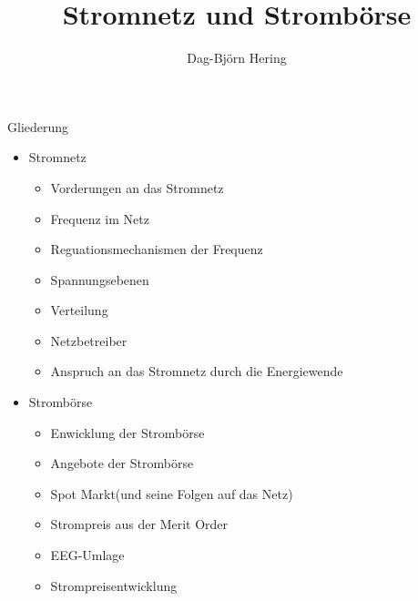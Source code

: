 \documentclass[aspectratio=1610, professionalfonts, 9pt]{beamer}
\title{Stromnetz und Strombörse}
\author[D.~Hering]{Dag-Björn Hering}
\begin{document}
\maketitle

\begin{frame}{Gliederung}
\begin{itemize}
  \item Stromnetz
  \begin{itemize}
  \item Vorderungen an das Stromnetz
  \item Frequenz im Netz
  \item Reguationsmechanismen der Frequenz
  \item Spannungsebenen
  \item Verteilung
  \item Netzbetreiber
  \item Anspruch an das Stromnetz durch die Energiewende
  \end{itemize}
\end{itemize}
\end{frame}

\begin{frame}
\begin{itemize}
 \item Strombörse
\begin{itemize}
  \item Enwicklung der Strombörse
  \item Angebote der Strombörse
  \item Spot Markt(und seine Folgen auf das Netz)
  \item Strompreis aus der Merit Order
  \item EEG-Umlage
  \item Strompreisentwicklung
\end{itemize}
\end{itemize}
\end{frame}
\end{document}
